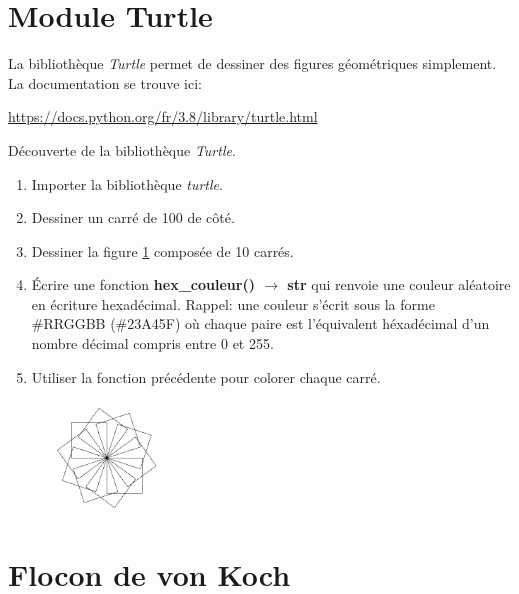 \documentclass[a4paper,11pt]{article}
\begin{document}
\begin{Form}
\section{Module Turtle}
La bibliothèque \emph{Turtle} permet de dessiner des figures géométriques simplement. La documentation se trouve ici:
\begin{center}
\url{https://docs.python.org/fr/3.8/library/turtle.html}
\end{center}
\begin{activite}
Découverte de la bibliothèque \emph{Turtle}.
\begin{enumerate}
\item Importer la bibliothèque \emph{turtle}.
\item Dessiner un carré de 100 de côté.
\item Dessiner la figure \ref{etoile} composée de 10 carrés.
\item Écrire une fonction \textbf{hex\_couleur() $\rightarrow$ str} qui renvoie une couleur aléatoire en écriture hexadécimal. Rappel: une couleur s'écrit sous la forme \#RRGGBB (\#23A45F) où chaque paire est l'équivalent héxadécimal d'un nombre décimal compris entre 0 et 255.
\item Utiliser la fonction précédente pour colorer chaque carré.
\end{enumerate}
\end{activite}
\begin{figure}[!h]
\centering
\includegraphics[width=3cm]{ressources/etoile.png}
\label{etoile}
\end{figure}
\section{Flocon de von Koch}

\end{Form}
\end{document}
